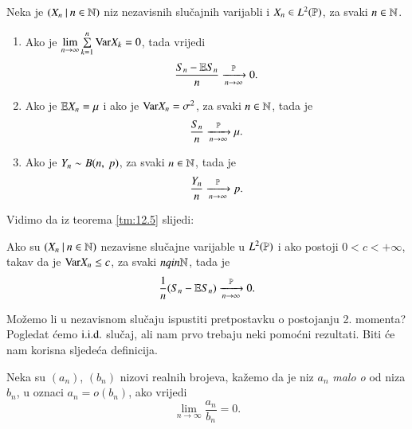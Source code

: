 \begin{zad} \label{zad:12.6}
    Neka je $({X_n} \: | \: {n \in \mathbb{N}})$ niz nezavisnih slu\v cajnih varijabli i $X_n \in L^2(\mathbb{P})$, za svaki $n \in \mathbb{N}$.
    \begin{enumerate}[label=(\alph*)]
        \item Ako je $\lim\limits_{n \to \infty} \sum\limits_{k = 1}^{n} \mathrm{Var} X_k = 0$, tada vrijedi
        \begin{equation*}
            \frac{S_n - \mathbb{E} S_n}{n} \xrightarrow[n \to \infty]{\mathbb{P}} 0.
        \end{equation*}
        \item Ako je $\mathbb{E} X_n = \mu$ i ako je $\mathrm{Var} X_n = \sigma^2$, za svaki $n \in \mathbb{N}$, tada je
        \begin{equation*}
            \frac{S_n}{n} \xrightarrow[n \to \infty]{\mathbb{P}} \mu.
        \end{equation*}
        \item Ako je $Y_n \sim B ({n}, \: {p})$, za svaki $n \in \mathbb{N}$, tada je
        \begin{equation*}
            \frac{Y_n}{n} \xrightarrow[n \to \infty]{\mathbb{P}} p.
        \end{equation*}
    \end{enumerate}
\end{zad}

Vidimo da iz teorema \ref{tm:12.5} slijedi:

\begin{kor} \label{kor:12.6}
    Ako su $({X_n} \: | \: {n \in \mathbb{N}})$ nezavisne slu\v cajne varijable u $L^2(\mathbb{P})$ i ako postoji $0 < c < +\infty$, takav da je $\mathrm{Var} X_n \leq c$, za svaki $n qin \mathbb{N}$, tada je
    \begin{equation*}
        \frac{1}{n} (S_n - \mathbb{E} S_n) \xrightarrow[n \to \infty]{\mathbb{P}} 0.
    \end{equation*}
\end{kor}

Mo\v zemo li u nezavisnom slu\v caju ispustiti pretpostavku o postojanju 2. momenta?
Pogledat \' cemo $\mathrm{i.i.d.}$ slu\v caj, ali nam prvo trebaju neki pomo\' cni rezultati.
Biti \' ce nam korisna sljede\' ca definicija.

\begin{defn}    \label{defn:12.6-1}
    Neka su $(a_n)$, $(b_n)$ nizovi realnih brojeva, ka\v zemo da je niz $a_n$ \emph{malo o} od niza $b_n$, u oznaci $a_n = o(b_n)$, ako vrijedi
    \begin{equation}    \label{jed:12.7}
        \lim\limits_{n \to \infty} \frac{a_n}{b_n} = 0.
    \end{equation}
\end{defn}

